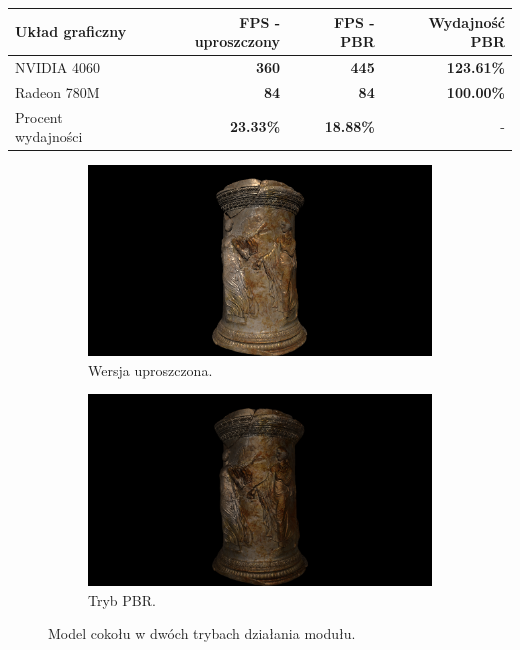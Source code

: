\begin{center}
	\begin{tabular}{ |l r r r|}
		\hline
		\textbf{Układ graficzny} & \textbf{FPS - uproszczony} & \textbf{FPS - PBR} & \textbf{Wydajność PBR} \\
		\hline
		NVIDIA 4060 & \textbf{360} & \textbf{445} & \textbf{123.61\%} \\
		Radeon 780M & \textbf{84} & \textbf{84} & \textbf{100.00\%} \\
		Procent wydajności & \textbf{23.33\%} & \textbf{18.88\%} & - \\
		\hline
	\end{tabular}
\end{center}

\begin{figure}[h!]
	\begin{subfigure}{.5\textwidth}
		\centering
		\includegraphics[width=\textwidth]{images/demo_highPoly.png}
		\caption{Wersja uproszczona.}
	\end{subfigure}
	\begin{subfigure}{.5\textwidth}
		\centering
		\includegraphics[width=\textwidth]{images/demo_highPoly_PBR.png}
		\caption{Tryb PBR.}
	\end{subfigure}
	\caption{Model cokołu w dwóch trybach działania modułu.}
	\label{test_highpoly}
\end{figure}

